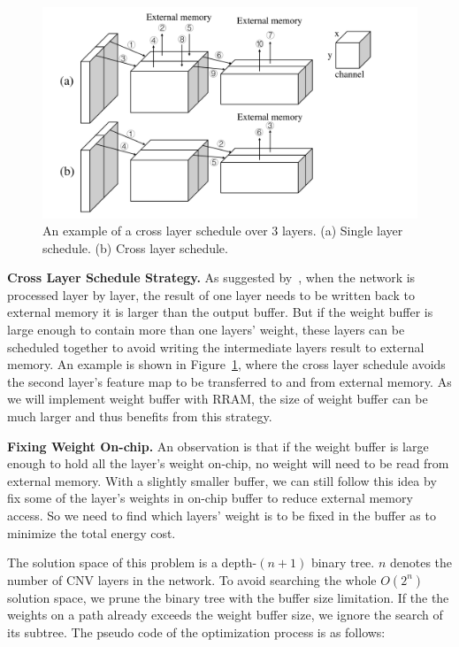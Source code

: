 \begin{figure}[t]
  \centering
  \includegraphics[width=1\columnwidth]{fig/cross_layer.pdf}
  \vspace{-5pt}
  \caption{An example of a cross layer schedule over 3 layers. (a) Single layer schedule. (b) Cross layer schedule.}
  \label{fig:cross_layer}
\end{figure}

{\bf{Cross Layer Schedule Strategy}.} As suggested by~\cite{alwani2016fused}, when the network is processed layer by layer, the result of one layer needs to be written back to external memory it is larger than the output buffer. But if the weight buffer is large enough to contain more than one layers' weight, these layers can be scheduled together to avoid writing the intermediate layers result to external memory. An example is shown in Figure~\ref{fig:cross_layer}, where the cross layer schedule avoids the second layer's feature map to be transferred to and from external memory. As we will implement weight buffer with RRAM, the size of weight buffer can be much larger and thus benefits from this strategy.

{\bf{Fixing Weight On-chip}.} An observation is that if the weight buffer is large enough to hold all the layer's weight on-chip, no weight will need to be read from external memory. With a slightly smaller buffer, we can still follow this idea by fix some of the layer's weights in on-chip buffer to reduce external memory access. So we need to find which layers' weight is to be fixed in the buffer as to minimize the total energy cost.

The solution space of this problem is a depth-$(n+1)$ binary tree. $n$ denotes the number of CNV layers in the network. To avoid searching the whole $O(2^n)$ solution space, we prune the binary tree with the buffer size limitation. If the the weights on a path already exceeds the weight buffer size, we ignore the search of its subtree. The pseudo code of the optimization process is as follows:

